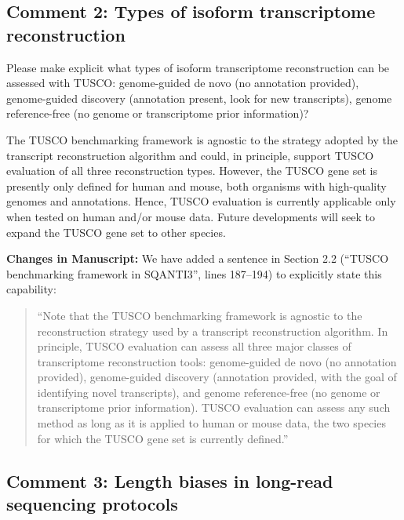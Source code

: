 \documentclass[11pt]{article}
\begin{document}
\subsection{Comment 2: Types of isoform transcriptome reconstruction}

\begin{reviewercomment}
Please make explicit what types of isoform transcriptome reconstruction can be assessed with TUSCO: genome-guided de novo (no annotation provided), genome-guided discovery (annotation present, look for new transcripts), genome reference-free (no genome or transcriptome prior information)?
\end{reviewercomment}

\begin{responseboxnew}
The TUSCO benchmarking framework is agnostic to the strategy adopted by the transcript reconstruction algorithm and could, in principle, support TUSCO evaluation of all three reconstruction types. However, the TUSCO gene set is presently only defined for human and mouse, both organisms with high-quality genomes and annotations. Hence, TUSCO evaluation is currently applicable only when tested on human and/or mouse data. Future developments will seek to expand the TUSCO gene set to other species.

\vspace{0.3cm}
\textbf{Changes in Manuscript:} We have added a sentence in Section 2.2 (``TUSCO benchmarking framework in SQANTI3'', lines 187--194) to explicitly state this capability:
\begin{quote}
``Note that the TUSCO benchmarking framework is agnostic to the reconstruction strategy used by a transcript reconstruction algorithm. In principle, TUSCO evaluation can assess all three major classes of transcriptome reconstruction tools: genome-guided de novo (no annotation provided), genome-guided discovery (annotation provided, with the goal of identifying novel transcripts), and genome reference-free (no genome or transcriptome prior information). TUSCO evaluation can assess any such method as long as it is applied to human or mouse data, the two species for which the TUSCO gene set is currently defined.''
\end{quote}
\end{responseboxnew}

\subsection{Comment 3: Length biases in long-read sequencing protocols}
\end{document}
